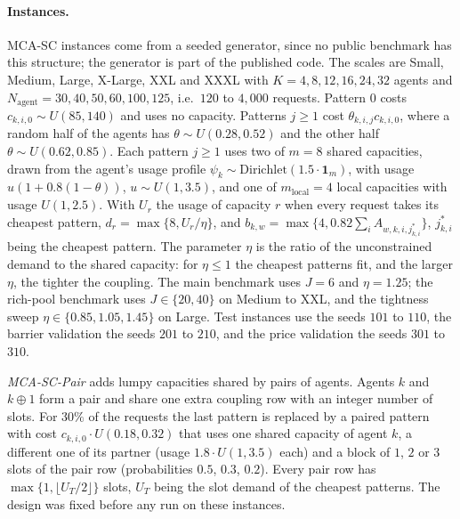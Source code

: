 \documentclass[a4paper,fleqn]{cas-sc}
\begin{document}
\paragraph{Instances.} MCA-SC instances come from a seeded generator, since no public benchmark has this structure; the generator is part of the published code. The scales are Small, Medium, Large, X-Large, XXL and XXXL with $K = 4, 8, 12, 16, 24, 32$ agents and $N_{\text{agent}} = 30, 40, 50, 60, 100, 125$, i.e.\ $120$ to $4{,}000$ requests. Pattern $0$ costs $c_{k,i,0} \sim U(85,140)$ and uses no capacity. Patterns $j \ge 1$ cost $\theta_{k,i,j} c_{k,i,0}$, where a random half of the agents has $\theta \sim U(0.28, 0.52)$ and the other half $\theta \sim U(0.62, 0.85)$. Each pattern $j \ge 1$ uses two of $m = 8$ shared capacities, drawn from the agent's usage profile $\psi_k \sim \text{Dirichlet}(1.5 \cdot \mathbf{1}_m)$, with usage $u (1 + 0.8(1-\theta))$, $u \sim U(1, 3.5)$, and one of $m_{\text{local}} = 4$ local capacities with usage $U(1, 2.5)$. With $U_r$ the usage of capacity $r$ when every request takes its cheapest pattern, $d_r = \max\{8, U_r/\eta\}$, and $b_{k,w} = \max\{4, 0.82 \sum_i A_{w,k,i,j^*_{k,i}}\}$, $j^*_{k,i}$ being the cheapest pattern. The parameter $\eta$ is the ratio of the unconstrained demand to the shared capacity: for $\eta \le 1$ the cheapest patterns fit, and the larger $\eta$, the tighter the coupling. The main benchmark uses $J = 6$ and $\eta = 1.25$; the rich-pool benchmark uses $J \in \{20, 40\}$ on Medium to XXL, and the tightness sweep $\eta \in \{0.85, 1.05, 1.45\}$ on Large. Test instances use the seeds $101$ to $110$, the barrier validation the seeds $201$ to $210$, and the price validation the seeds $301$ to $310$.

\textit{MCA-SC-Pair} adds lumpy capacities shared by pairs of agents. Agents $k$ and $k \oplus 1$ form a pair and share one extra coupling row with an integer number of slots. For $30\%$ of the requests the last pattern is replaced by a paired pattern with cost $c_{k,i,0} \cdot U(0.18, 0.32)$ that uses one shared capacity of agent $k$, a different one of its partner (usage $1.8 \cdot U(1, 3.5)$ each) and a block of $1$, $2$ or $3$ slots of the pair row (probabilities $0.5$, $0.3$, $0.2$). Every pair row has $\max\{1, \lfloor U_T/2 \rfloor\}$ slots, $U_T$ being the slot demand of the cheapest patterns. The design was fixed before any run on these instances.
\end{document}
